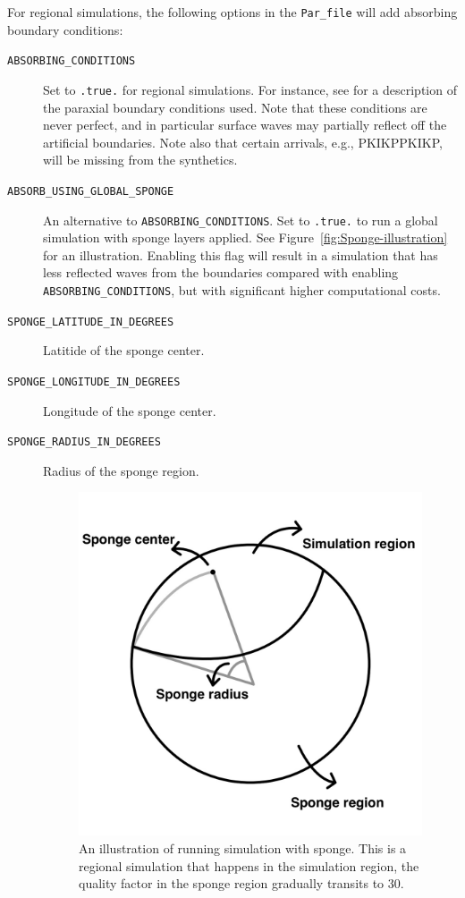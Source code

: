 For regional simulations, the following options in the \texttt{Par\_file} will add absorbing boundary conditions:
\begin{description}
%
\item [{\texttt{ABSORBING\_CONDITIONS}}] Set to \texttt{.true.}{\small{}
}for regional simulations. For instance, see \citet{KoTr99} for a
description of the paraxial boundary conditions used. Note that these
conditions are never perfect, and in particular surface waves may
partially reflect off the artificial boundaries. Note also that certain
arrivals, e.g., PKIKPPKIKP, will be missing from the synthetics.
%
\item [{\texttt{ABSORB\_USING\_GLOBAL\_SPONGE}}] An alternative to {\texttt{ABSORBING\_CONDITIONS}}. Set to \texttt{.true.} to run a global simulation with sponge layers applied. See Figure~\vref{fig:Sponge-illustration}
for an illustration. Enabling this flag will result in a simulation that has less reflected waves from the boundaries compared with enabling {\texttt{ABSORBING\_CONDITIONS}}, but with significant higher computational costs.
\item [{\texttt{SPONGE\_LATITUDE\_IN\_DEGREES}}] Latitide of the sponge center.
\item [{\texttt{SPONGE\_LONGITUDE\_IN\_DEGREES}}] Longitude of the sponge center.
\item [{\texttt{SPONGE\_RADIUS\_IN\_DEGREES}}] Radius of the sponge region.
%
\begin{figure}[H]
\begin{centering}
\includegraphics[scale=0.2]{figures/fig6.jpg}
\par\end{centering}
\caption{An illustration of running simulation with sponge.
This is a regional simulation that happens in the simulation region, the quality factor in the sponge region gradually transits to 30.}
\label{fig:Sponge-illustration}
\end{figure}
%
\end{description}


